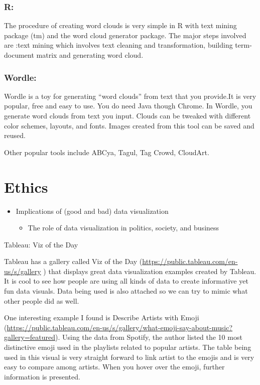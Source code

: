 \documentclass[]{book}
\providecommand{\tightlist}{%
  \setlength{\itemsep}{0pt}\setlength{\parskip}{0pt}}
\theoremstyle{definition}
\theoremstyle{definition}
\theoremstyle{definition}
\theoremstyle{remark}
\begin{document}
\subsection{R:}\label{r}

The procedure of creating word clouds is very simple in R with text
mining package (tm) and the word cloud generator package. The major
steps involved are :text mining which involves text cleaning and
transformation, building term-document matrix and generating word cloud.
\citep{r}

\subsection{Wordle:}\label{wordle}

Wordle is a toy for generating ``word clouds'' from text that you
provide.It is very popular, free and easy to use. You do need Java
though Chrome. In Wordle, you generate word clouds from text you input.
Clouds can be tweaked with different color schemes, layouts, and fonts.
Images created from this tool can be saved and reused. \citep{wordle}

Other popular tools include ABCya, Tagul, Tag Crowd, CloudArt.

\chapter{Ethics}\label{ethics}

\begin{itemize}
\tightlist
\item
  Implications of (good and bad) data visualization

  \begin{itemize}
  \tightlist
  \item
    The role of data visualization in politics, society, and business
  \end{itemize}
\end{itemize}

Tableau: Viz of the Day

Tableau has a gallery called Viz of the Day
(\url{https://public.tableau.com/en-us/s/gallery} ) that displays great
data visualization examples created by Tableau. It is cool to see how
people are using all kinds of data to create informative yet fun data
visuals. Data being used is also attached so we can try to mimic what
other people did as well.

One interesting example I found is Describe Artists with Emoji
(\url{https://public.tableau.com/en-us/s/gallery/what-emoji-say-about-music?gallery=featured}).
Using the data from Spotify, the author listed the 10 most distinctive
emoji used in the playlists related to popular artists. The table being
used in this visual is very straight forward to link artist to the
emojis and is very easy to compare among artists. When you hover over
the emoji, further information is presented.
\end{document}
